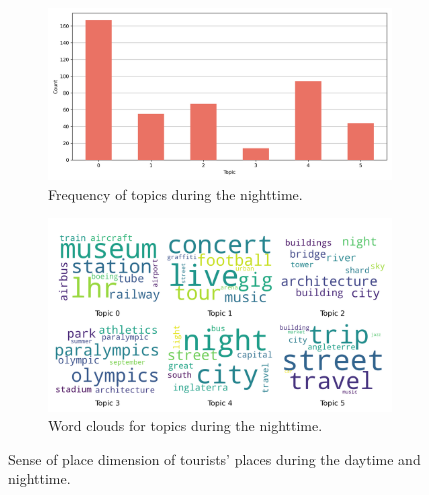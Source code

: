 \documentclass{article}
\theoremstyle{definition}
\theoremstyle{remark}
\begin{document}
\begin{figure}[!h]
    \begin{subfigure}{0.45\textwidth}
        \centering
        \includegraphics[width=\linewidth]{figures/places_sense_nighttime_tourists.png}
        \caption{Frequency of topics during the nighttime.}
        \label{fig:places_sense_nighttime_tourists}
    \end{subfigure}
    \hfill
    \begin{subfigure}{0.5\textwidth}
        \centering
        \includegraphics[width=\linewidth]{figures/topics_nighttime_tourists.png}
        \caption{Word clouds for topics during the nighttime.}
        \label{fig:topics_nighttime_tourists}
    \end{subfigure}

    \caption{Sense of place dimension of tourists' places during the daytime and nighttime.}
    \label{fig:places_topics_sense_tourists_day}
\end{figure}
\end{document}
